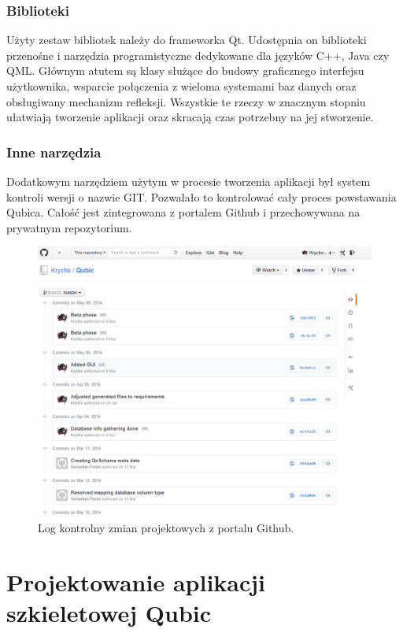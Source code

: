 \documentclass[12pt]{report}
\begin{document}
\subsection{Biblioteki}
Użyty zestaw bibliotek należy do frameworka Qt. Udostępnia on biblioteki przenośne i narzędzia programistyczne dedykowane dla języków C++, Java czy QML. Głównym atutem są klasy służące do budowy graficznego interfejsu użytkownika, wsparcie połączenia z wieloma systemami baz danych oraz obsługiwany mechanizm refleksji. Wszystkie te rzeczy w znacznym stopniu ułatwiają tworzenie aplikacji oraz skracają czas potrzebny na jej stworzenie.
\subsection{Inne narzędzia}
Dodatkowym narzędziem użytym w procesie tworzenia aplikacji był system kontroli wersji o nazwie GIT. Pozwalało to kontrolować cały proces powstawania Qubica. Całość jest zintegrowana z portalem Github i przechowywana na prywatnym repozytorium.

\begin{figure}[h]
	\centering
	\includegraphics[width=.9\textwidth]{images/git.png}
	\caption{Log kontrolny zmian projektowych z portalu Github.}
\end{figure}
\FloatBarrier

\chapter{Projektowanie aplikacji szkieletowej Qubic} \label{rozdz.czesc.prakt}
\end{document}
